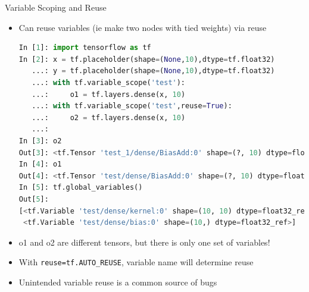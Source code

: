 \documentclass[]{beamer}
\begin{document}
\begin{frame}[fragile]{Variable Scoping and Reuse}
\begin{itemize}
\item Can reuse variables (ie make two nodes with tied weights) via reuse
\lstset{style=mystyle2}
\begin{lstlisting}[language=python]
In [1]: import tensorflow as tf
In [2]: x = tf.placeholder(shape=(None,10),dtype=tf.float32)
   ...: y = tf.placeholder(shape=(None,10),dtype=tf.float32)
   ...: with tf.variable_scope('test'):
   ...:     o1 = tf.layers.dense(x, 10)
   ...: with tf.variable_scope('test',reuse=True):
   ...:     o2 = tf.layers.dense(x, 10)
   ...:     
In [3]: o2
Out[3]: <tf.Tensor 'test_1/dense/BiasAdd:0' shape=(?, 10) dtype=float32>
In [4]: o1
Out[4]: <tf.Tensor 'test/dense/BiasAdd:0' shape=(?, 10) dtype=float32>
In [5]: tf.global_variables()
Out[5]: 
[<tf.Variable 'test/dense/kernel:0' shape=(10, 10) dtype=float32_ref>,
 <tf.Variable 'test/dense/bias:0' shape=(10,) dtype=float32_ref>]
\end{lstlisting}
\lstset{style=mystyle}
\item o1 and o2 are different tensors, but there is only one set of variables!
\item With \verb|reuse=tf.AUTO_REUSE|, variable name will determine reuse
\item Unintended variable reuse is a common source of bugs
\end{itemize}
\end{frame}
\end{document}
